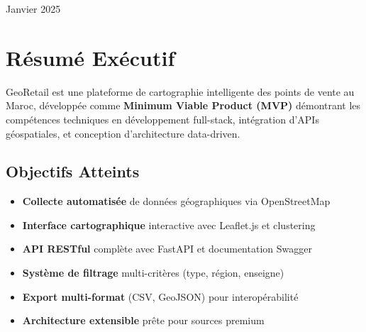 \documentclass[11pt,a4paper]{article}
\begin{document}
\begin{titlepage}
    \vfill
    
    {\large\color{gray} Janvier 2025}
    
\end{titlepage}


\section{Résumé Exécutif}

\begin{highlightbox}
GeoRetail est une plateforme de cartographie intelligente des points de vente au Maroc, développée comme \textbf{Minimum Viable Product (MVP)} démontrant les compétences techniques en développement full-stack, intégration d'APIs géospatiales, et conception d'architecture data-driven.
\end{highlightbox}

\subsection{Objectifs Atteints}

\begin{itemize}[leftmargin=*]
    \item[\color{secondary}\faCheckCircle] \textbf{Collecte automatisée} de données géographiques via OpenStreetMap
    \item[\color{secondary}\faCheckCircle] \textbf{Interface cartographique} interactive avec Leaflet.js et clustering
    \item[\color{secondary}\faCheckCircle] \textbf{API RESTful} complète avec FastAPI et documentation Swagger
    \item[\color{secondary}\faCheckCircle] \textbf{Système de filtrage} multi-critères (type, région, enseigne)
    \item[\color{secondary}\faCheckCircle] \textbf{Export multi-format} (CSV, GeoJSON) pour interopérabilité
    \item[\color{secondary}\faCheckCircle] \textbf{Architecture extensible} prête pour sources premium
\end{itemize}

\end{document}
